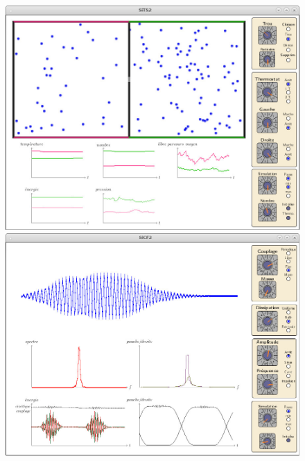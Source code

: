 \begin{titlepage}
\begin{center}
\begin{figure}[htbp]
\begin{minipage}[c]{.45\linewidth}
\begin{center}
\includegraphics[scale=0.25]{./illustration/SiTS2}
\end{center}
\end{minipage}
\hfill
\begin{minipage}[c]{.45\linewidth}
\begin{center}
\includegraphics[scale=0.23]{./illustration/SiCF2}
\end{center}
\end{minipage}
\end{figure}
~\\[1cm]


\end{center}
\end{titlepage}
